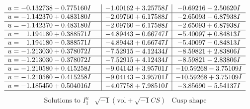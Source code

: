 \documentclass[1p]{elsarticle_modified}
\theoremstyle{definition}
\newcommand{\I}{\sqrt{-1}}
\begin{document}
$$\begin{array}{c|c|c}
\begin{aligned}
u &= -0.132738 - 0.775160 I\end{aligned}
 & -1.00162 + 3.25758 I & -0.69216 - 2.50620 I \\ \hline\begin{aligned}
u &= -1.142370 + 0.483180 I\end{aligned}
 & -2.09760 + 6.17588 I & -2.65093 - 6.87938 I \\ \hline\begin{aligned}
u &= -1.142370 - 0.483180 I\end{aligned}
 & -2.09760 - 6.17588 I & -2.65093 + 6.87938 I \\ \hline\begin{aligned}
u &= \phantom{-}1.194180 + 0.388571 I\end{aligned}
 & -4.89443 - 0.66747 I & -5.40097 + 0.84813 I \\ \hline\begin{aligned}
u &= \phantom{-}1.194180 - 0.388571 I\end{aligned}
 & -4.89443 + 0.66747 I & -5.40097 - 0.84813 I \\ \hline\begin{aligned}
u &= -1.213030 + 0.378072 I\end{aligned}
 & -7.52915 - 4.12434 I & -8.59821 + 2.83806 I \\ \hline\begin{aligned}
u &= -1.213030 - 0.378072 I\end{aligned}
 & -7.52915 + 4.12434 I & -8.59821 - 2.83806 I \\ \hline\begin{aligned}
u &= -1.210580 + 0.415258 I\end{aligned}
 & -9.04143 + 3.95701 I & -10.59268 - 3.75109 I \\ \hline\begin{aligned}
u &= -1.210580 - 0.415258 I\end{aligned}
 & -9.04143 - 3.95701 I & -10.59268 + 3.75109 I \\ \hline\begin{aligned}
u &= -1.185450 + 0.504016 I\end{aligned}
 & -4.07758 + 7.98510 I & -3.85690 - 5.54137 I\\
 \hline 
 \end{array}$$\newpage$$\begin{array}{c|c|c}  
\text{Solutions to }I^u_{1}& \I (\text{vol} + \sqrt{-1}CS) & \text{Cusp shape}\\
 \hline 
\begin{aligned}

\end{aligned}
\end{array}$$
\end{document}
